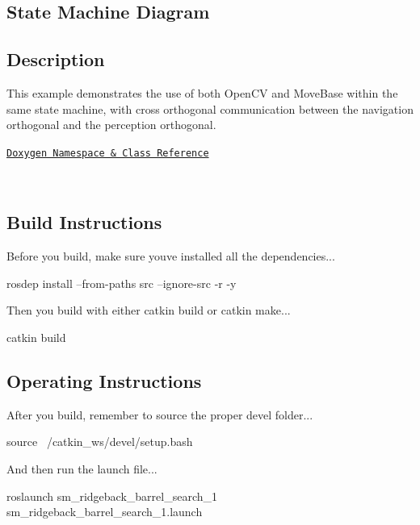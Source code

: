 \subsection*{State Machine Diagram}



\subsection*{Description}

This example demonstrates the use of both Open\+CV and Move\+Base within the same state machine, with cross orthogonal communication between the navigation orthogonal and the perception orthogonal.~\newline


\href{https://reelrbtx.github.io/SMACC_Documentation/master/html/namespacesm__moveit.html}{\tt Doxygen Namespace \& Class Reference} ~\newline


 

~\newline
 \subsection*{Build Instructions}

Before you build, make sure you\textquotesingle{}ve installed all the dependencies...


\begin{DoxyCode}
rosdep install --from-paths src --ignore-src -r -y 
\end{DoxyCode}


Then you build with either catkin build or catkin make...


\begin{DoxyCode}
catkin build
\end{DoxyCode}


\subsection*{Operating Instructions}

After you build, remember to source the proper devel folder...


\begin{DoxyCode}
source ~/catkin\_ws/devel/setup.bash
\end{DoxyCode}


And then run the launch file...


\begin{DoxyCode}
roslaunch sm\_ridgeback\_barrel\_search\_1 sm\_ridgeback\_barrel\_search\_1.launch
\end{DoxyCode}


